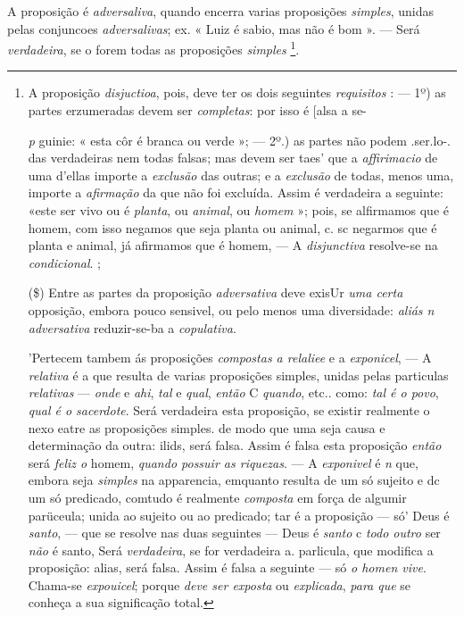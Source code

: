 A proposição é \emph{adversaliva}, quando encerra varias proposições \emph{simples}, unidas pelas conjuncoes \emph{adversalivas}; ex. « Luiz é sabio, mas não é bom ». --- Será \emph{verdadeira}, se o forem todas as proposições \emph{simples} \footnote{A proposição \emph{disjuctioa}, pois, deve ter os dois seguintes \emph{requisitos} : --- 1º) as partes erzumeradas devem ser \emph{completas}: por isso é [alsa a se-\par \emph{p} guinie: « esta côr é branca ou verde »; --- 2º.) as partes não podem .ser.lo-. das verdadeiras nem todas falsas; mas devem ser taes' que a \emph{affirimacio} de uma d'ellas importe a \emph{exclusão} das outras; e a \emph{exclusão} de todas, menos uma, importe a \emph{afirmação} da que não foi excluída. Assim é verdadeira a seguinte: «este ser vivo ou é \emph{planta}, ou \emph{animal}, ou \emph{homem} »; pois, se alfirmamos que é homem, com isso negamos que seja planta ou animal, c. sc negarmos que é planta e animal, já afirmamos que é homem, --- A \emph{disjunctiva} resolve-se na \emph{condicional}. ;\par (\$) Entre as partes da proposição \emph{adversativa} deve exisUr \emph{uma certa} opposição, embora pouco sensivel, ou pelo menos uma diversidade: \emph{aliás n adversativa} reduzir-se-ba a \emph{copulativa}.\par 'Pertecem tambem ás proposições \emph{compostas a relaliee} e a \emph{exponicel}, --- A \emph{relativa} é a que resulta de varias proposições simples, unidas pelas particulas \emph{relativas} --- \emph{onde} e \emph{ahi}, \emph{tal} e \emph{qual}, \emph{então} C \emph{quando}, etc.. como: \emph{tal é o povo}, \emph{qual é o sacerdote}. Será verdadeira esta proposição, se existir realmente o nexo eatre as proposições simples. de modo que uma seja causa e determinação da outra: ilids, será falsa. Assim é falsa esta proposição \emph{então} será \emph{feliz o} homem, \emph{quando possuir as riquezas}. --- A \emph{exponivel} é \emph{n} que, embora seja \emph{simples} na apparencia, emquanto resulta de um só sujeito e dc um só predicado, comtudo é realmente \emph{composta} em força de algumir parüceula; unida ao sujeito ou ao predicado; tar é a proposição --- só' Deus é \emph{santo}, --- que se resolve nas duas seguintes --- Deus é \emph{santo} c \emph{todo outro} ser \emph{não} é santo, Será \emph{verdadeira}, se for verdadeira a. parlicula, que modifica a proposição: alias, será falsa. Assim é falsa a seguinte --- só \emph{o homen vive}. Chama-se \emph{expouicel}; porque \emph{deve ser exposta} ou \emph{explicada}, \emph{para que} se conheça a sua significação total.}.

